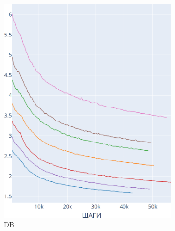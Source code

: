 \documentclass{spbau-diploma}
\begin{document}
\begin{figure}[h]
	\begin{subfigure}{.3\textwidth}
		\centering
		\includegraphics[scale=0.2]{BooksCorpus_DB}
		\caption{DB}
		\label{fig:BooksCorpus_graphs_DB}
	\end{subfigure}
	\begin{subfigure}{.3\textwidth}
		\centering

\end{subfigure}
\end{figure}
\end{document}
